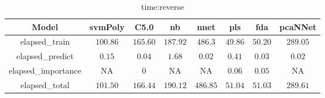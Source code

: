\begin{table}[!ht]
	\centering
	\begin{tabular}{|c|c|c|c|c|c|c|c|}
		\hline
		Model & svmPoly & C5.0 & nb & nnet & pls & fda & pcaNNet \\ \hline
		elapsed_train & $100.86$ & $165.60$ & $187.92$ & $486.3$ & $49.86$ & $50.20$ & $289.05$ \\ \hline
		elapsed_predict & $0.15$ & $0.04$ & $1.68$ & $0.02$ & $0.41$ & $0.03$ & $0.02$ \\ \hline
		elapsed_importance & NA & $0$ & NA & NA & $0.06$ & $0.05$ & NA \\ \hline
		elapsed_total & $101.50$ & $166.44$ & $190.12$ & $486.85$ & $51.04$ & $51.03$ & $289.61$ \\ \hline
	\end{tabular}
	\caption{time:reverse}
	\label{tab:time:reverse}
\end{table}
